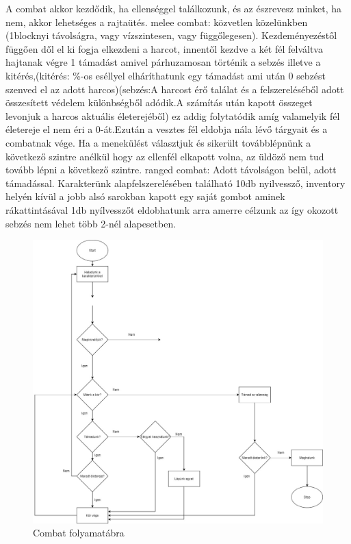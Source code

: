 
A combat akkor kezdődik, ha ellenséggel találkozunk, és az észrevesz minket, ha nem, akkor lehetséges a rajtaütés.
melee combat: közvetlen közelünkben (1blocknyi távolságra, vagy vízszintesen, vagy függőlegesen).
Kezdeményezéstől függően dől el ki fogja elkezdeni a harcot, innentől kezdve a két fél felváltva hajtanak végre 1 támadást amivel párhuzamosan történik a sebzés illetve a kitérés,(kitérés: \%-os eséllyel elháríthatunk egy támadást ami után 0 sebzést szenved el az adott harcos)(sebzés:A harcost érő találat és a felszereléséből adott összesített védelem különbségből adódik.A számítás után kapott összeget levonjuk a harcos aktuális életerejéből) ez addig folytatódik amíg valamelyik fél életereje el nem éri a 0-át.Ezután a vesztes fél eldobja nála lévő tárgyait és a combatnak vége.
Ha a menekülést választjuk és sikerült továbblépnünk a következő szintre anélkül hogy az ellenfél elkapott volna, az üldöző nem tud tovább lépni a következő szintre.
ranged combat: Adott távolságon belül, adott támadással.
Karakterünk alapfelszerelésében található 10db nyilvessző, inventory helyén kívül a jobb alsó sarokban kapott egy saját gombot aminek rákattintásával 1db nyílvesszőt eldobhatunk arra amerre célzunk az így okozott sebzés nem lehet több 2-nél alapesetben.

\begin{figure}[h]
	\centering
	\includegraphics[width=\textwidth]{images/image5.png}
	\caption{Combat folyamatábra}
	\label{fig:combat2}
\end{figure}

